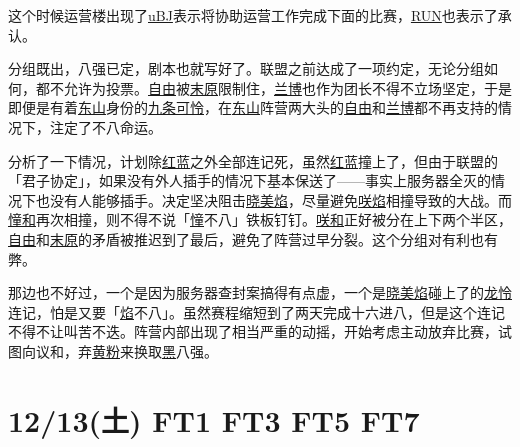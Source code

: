 这个时候运营楼出现了\uline{uBJ}表示将协助运营工作完成下面的比赛，\uline{RUN}也表示了承认。

分组既出，八强已定，剧本也就写好了。联盟之前达成了一项约定，无论分组如何，都不允许为投票。\uline{自由}被\uline{末原}限制住，\uline{兰博}也作为团长不得不立场坚定，于是即便是有着\uline{东山}身份的\uline{九条可怜}，在\uline{东山}阵营两大头的\uline{自由}和\uline{兰博}都不再支持的情况下，注定了不八命运。

分析了一下情况，计划除\uline{红蓝}之外全部连记死，虽然\uline{红蓝}撞上了，但由于联盟的「君子协定」，如果没有外人插手的情况下基本保送了——事实上服务器全灭的情况下也没有人能够插手。决定坚决阻击\uline{晓美焰}，尽量避免\uline{咲焰}相撞导致的大战。而\uline{憧和}再次相撞，则不得不说「\uline{憧}不八」铁板钉钉。\uline{咲和}正好被分在上下两个半区，\uline{自由}和\uline{末原}的矛盾被推迟到了最后，避免了阵营过早分裂。这个分组对有利也有弊。

那边也不好过，一个是因为服务器查封案搞得有点虚，一个是\uline{晓美焰}碰上了的\uline{龙怜}连记，怕是又要「\uline{焰}不八」。虽然赛程缩短到了两天完成十六进八，但是这个连记不得不让叫苦不迭。阵营内部出现了相当严重的动摇，开始考虑主动放弃比赛，试图向议和，弃\uline{黄粉}来换取\uline{黑}八强。

\section{12/13(土) FT1 FT3 FT5 FT7}


